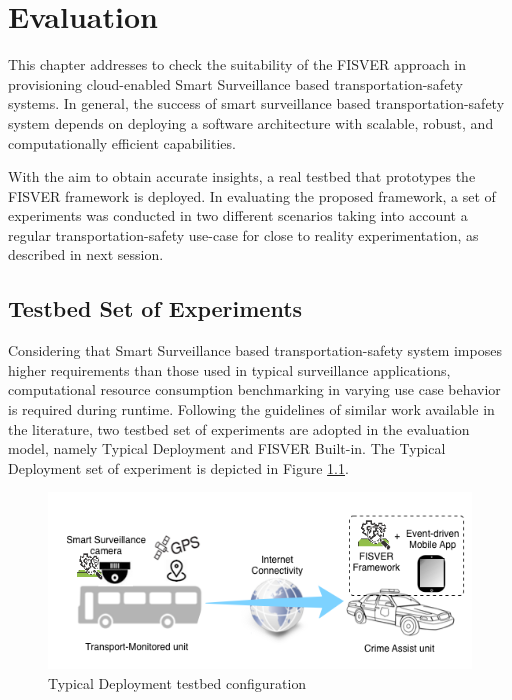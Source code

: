 \chapter{Evaluation}

This chapter addresses to check the suitability of the FISVER approach in provisioning cloud-enabled Smart Surveillance based transportation-safety systems. In general, the success of smart surveillance based transportation-safety system depends on deploying a software architecture with scalable, robust, and computationally efficient capabilities.

With the aim to obtain accurate insights, a real testbed that prototypes the FISVER framework is deployed. In evaluating the proposed framework, a set of experiments was conducted in two different scenarios taking into account a regular transportation-safety use-case for close to reality experimentation, as described in next session.

\section{Testbed Set of Experiments}

Considering that Smart Surveillance based transportation-safety system imposes higher requirements than those used in typical surveillance applications, computational resource consumption benchmarking in varying use case behavior is required during runtime. Following the guidelines of similar work available in the literature\cite{Evaluation1}\cite{Evaluation6}, two testbed set of experiments are adopted in the evaluation model, namely Typical Deployment and FISVER Built-in. The Typical Deployment set of experiment is depicted in Figure \ref{fig:tydep}. 

\begin{figure}[!htb]
	\centering
 	\includegraphics[scale=0.8]{Imagens/cap5_typical_testbed.png}
 	\caption{Typical Deployment testbed configuration}
 	\label{fig:tydep}
\end{figure}

